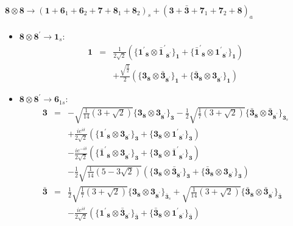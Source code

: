 \documentclass[english]{article}
\newcommand{\subcg}[3]{\big\{ {#1}\otimes{#2}\big\}^{}_{#3}}
\newcommand{\rep}[1]{\mathbf{#1}}
\begin{document}
\paragraph*{\Large $\rep{8}\otimes\rep{8}\to\left(\rep{1}+\rep{6}_{1}+\rep{6}_{2}+\rep{7}+\rep{8}_{1}+\rep{8}_{2}\right)_s+\left(\rep{3}+\rep{\bar{3}}+\rep{7}_{1}+\rep{7}_{2}+\rep{8}\right)_a$}
\begin{itemize}
\item $\rep{8}\otimes\rep{8^{\prime}}\to\rep{1}_{s}$:
\begin{eqnarray*}
\rep{1} &=& \frac{1}{2 \sqrt{2}}\left(\subcg{\rep{1^{\prime}}_{\rep{8}}}{\rep{\bar{1}^{\prime}}_{\rep{8^{\prime}}}}{\rep{1}}+\subcg{\rep{\bar{1}^{\prime}}_{\rep{8}}}{\rep{1^{\prime}}_{\rep{8^{\prime}}}}{\rep{1}}\right) \\ 
 & & +\frac{\sqrt{\frac{3}{2}}}{2}\left(\subcg{\rep{3}_{\rep{8}}}{\rep{\bar{3}}_{\rep{8^{\prime}}}}{\rep{1}}+\subcg{\rep{\bar{3}}_{\rep{8}}}{\rep{3}_{\rep{8^{\prime}}}}{\rep{1}}\right)
\end{eqnarray*}
\item $\rep{8}\otimes\rep{8^{\prime}}\to\rep{6}_{1s}$:
\begin{eqnarray*}
\rep{3} &=& -\sqrt{\frac{1}{14} \left(3+\sqrt{2}\right)}\subcg{\rep{3}_{\rep{8}}}{\rep{3}_{\rep{8^{\prime}}}}{\rep{3}}-\frac{1}{2} \sqrt{\frac{1}{7} \left(3+\sqrt{2}\right)}\subcg{\rep{\bar{3}}_{\rep{8}}}{\rep{\bar{3}}_{\rep{8^{\prime}}}}{\rep{3}_{s}} \\ 
 & & +\frac{i e^{i \delta }}{2 \sqrt{2}}\left(\subcg{\rep{1^{\prime}}_{\rep{8}}}{\rep{3}_{\rep{8^{\prime}}}}{\rep{3}}+\subcg{\rep{3}_{\rep{8}}}{\rep{1^{\prime}}_{\rep{8^{\prime}}}}{\rep{3}}\right) \\ 
 & & -\frac{i e^{-i \delta }}{2 \sqrt{2}}\left(\subcg{\rep{\bar{1}^{\prime}}_{\rep{8}}}{\rep{3}_{\rep{8^{\prime}}}}{\rep{3}}+\subcg{\rep{3}_{\rep{8}}}{\rep{\bar{1}^{\prime}}_{\rep{8^{\prime}}}}{\rep{3}}\right) \\ 
 & & -\frac{1}{2} \sqrt{\frac{1}{14} \left(5-3 \sqrt{2}\right)}\left(\subcg{\rep{3}_{\rep{8}}}{\rep{\bar{3}}_{\rep{8^{\prime}}}}{\rep{3}}+\subcg{\rep{\bar{3}}_{\rep{8}}}{\rep{3}_{\rep{8^{\prime}}}}{\rep{3}}\right)
\\
\rep{\bar{3}} &=& \frac{1}{2} \sqrt{\frac{1}{7} \left(3+\sqrt{2}\right)}\subcg{\rep{3}_{\rep{8}}}{\rep{3}_{\rep{8^{\prime}}}}{\rep{\bar{3}}_{s}}+\sqrt{\frac{1}{14} \left(3+\sqrt{2}\right)}\subcg{\rep{\bar{3}}_{\rep{8}}}{\rep{\bar{3}}_{\rep{8^{\prime}}}}{\rep{\bar{3}}} \\ 
 & & -\frac{i e^{i \delta }}{2 \sqrt{2}}\left(\subcg{\rep{1^{\prime}}_{\rep{8}}}{\rep{\bar{3}}_{\rep{8^{\prime}}}}{\rep{\bar{3}}}+\subcg{\rep{\bar{3}}_{\rep{8}}}{\rep{1^{\prime}}_{\rep{8^{\prime}}}}{\rep{\bar{3}}}\right) \\ 

\end{eqnarray*}
\end{itemize}
\end{document}
